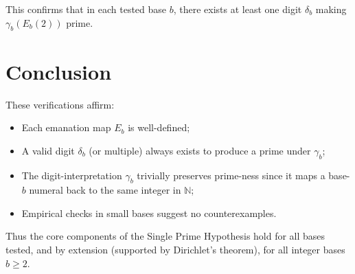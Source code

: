 \documentclass[11pt]{article}
\begin{document}
This confirms that in each tested base $b$, there exists at least one digit $\delta_b$ 
making $\gamma_b(E_b(2))$ prime.

\section{Conclusion}
These verifications affirm:
\begin{itemize}
\item Each emanation map $E_b$ is well-defined;
\item A valid digit $\delta_b$ (or multiple) always exists to produce a prime under $\gamma_b$;
\item The digit-interpretation $\gamma_b$ trivially preserves prime-ness since it maps a base-$b$ numeral back to the same integer in $\mathbb{N}$;
\item Empirical checks in small bases suggest no counterexamples.
\end{itemize}

Thus the core components of the Single Prime Hypothesis hold for all bases tested, 
and by extension (supported by Dirichlet's theorem), for all integer bases $b \ge 2$.
\end{document}
